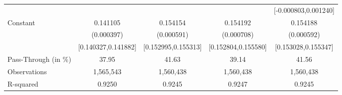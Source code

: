 {\begin{tabular}{l*{4}{c}}
                    &                     &                     &                     &[-0.000803,0.001240]         \\
Constant            &    0.141105\sym{***}&    0.154154\sym{***}&    0.154192\sym{***}&    0.154188\sym{***}\\
                    &  (0.000397)         &  (0.000591)         &  (0.000708)         &  (0.000592)         \\
                    &[0.140327,0.141882]         &[0.152995,0.155313]         &[0.152804,0.155580]         &[0.153028,0.155347]         \\
\midrule
Pass-Through (in \%)&       37.95         &       41.63         &       39.14         &       41.56         \\
Observations        &   1,565,543         &   1,560,438         &   1,560,438         &   1,560,438         \\
R-squared           &      0.9250         &      0.9245         &      0.9247         &      0.9245         \\
\bottomrule
\end{tabular}
}
